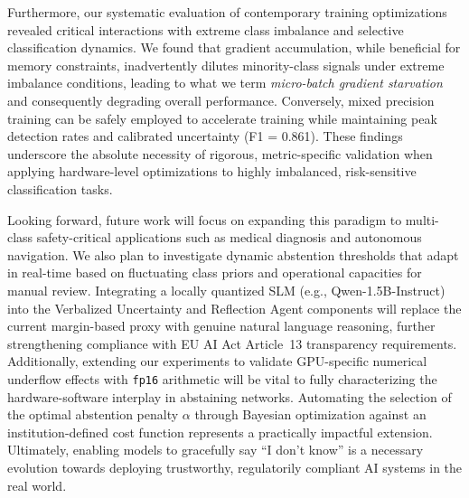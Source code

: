 \documentclass[12pt,a4paper]{article}
\begin{document}
Furthermore, our systematic evaluation of contemporary training optimizations
revealed critical interactions with extreme class imbalance and selective
classification dynamics. We found that gradient accumulation, while beneficial
for memory constraints, inadvertently dilutes minority-class signals under
extreme imbalance conditions, leading to what we term \textit{micro-batch
gradient starvation} and consequently degrading overall performance. Conversely,
mixed precision training can be safely employed to accelerate training while
maintaining peak detection rates and calibrated uncertainty (F1 = 0.861). These
findings underscore the absolute necessity of rigorous, metric-specific
validation when applying hardware-level optimizations to highly imbalanced,
risk-sensitive classification tasks.

Looking forward, future work will focus on expanding this paradigm to
multi-class safety-critical applications such as medical diagnosis and autonomous
navigation. We also plan to investigate dynamic abstention thresholds that adapt
in real-time based on fluctuating class priors and operational capacities for
manual review. Integrating a locally quantized SLM (e.g., Qwen-1.5B-Instruct)
into the Verbalized Uncertainty and Reflection Agent components will replace the
current margin-based proxy with genuine natural language reasoning, further
strengthening compliance with EU AI Act Article~13 transparency requirements.
Additionally, extending our experiments to validate GPU-specific numerical
underflow effects with \texttt{fp16} arithmetic will be vital to fully
characterizing the hardware-software interplay in abstaining networks.
Automating the selection of the optimal abstention penalty $\alpha$ through
Bayesian optimization against an institution-defined cost function represents a
practically impactful extension. Ultimately, enabling models to gracefully
say ``I don't know'' is a necessary evolution towards deploying trustworthy,
regulatorily compliant AI systems in the real world.


\end{document}
